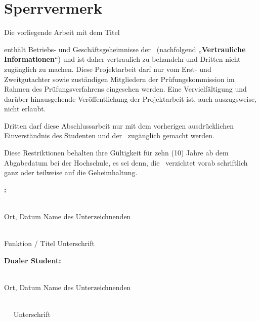 \newpage
{}
\section*{Sperrvermerk}

Die vorliegende Arbeit mit dem Titel

\begin{center}
	\normalsize\textit{\projecttitle}
\end{center}

enthält Betriebs- und Geschäftsgeheimnisse der \companyname\ (nachfolgend „\textbf{Vertrauliche Informationen}“) und ist daher vertraulich zu behandeln und Dritten nicht zugänglich zu machen.
Diese Projektarbeit darf nur vom Erst- und Zweitgutachter sowie zuständigen Mitgliedern der Prüfungskommission im Rahmen des Prüfungsverfahrens eingesehen werden. Eine Vervielfältigung und darüber hinausgehende Veröffentlichung der Projektarbeit ist, auch auszugsweise, nicht erlaubt.

Dritten darf diese Abschlussarbeit nur mit dem vorherigen ausdrücklichen Einverständnis des Studenten und der \companyname\ zugänglich gemacht werden.

Diese Restriktionen behalten ihre Gültigkeit für zehn (10) Jahre ab dem Abgabedatum bei der Hochschule, es sei denn, die \companyname\ verzichtet vorab schriftlich ganz oder teilweise auf die Geheimhaltung.

\vspace{0.2cm}

\textbf{\companyname:}

\vspace{0.9cm}

\noindent
\linedEntry{6.8cm}{\large\signaturelocation, \today} \hfill \linedEntry{6.8cm}{\large\signaturename} \\
\noindent
Ort, Datum
\hfill
Name des Unterzeichnenden

\vspace{0.9cm}

\noindent
\linedEntry{6.8cm}{\large\signaturefunction} \hfill \makebox[6.8cm]{\hrulefill} \\
\noindent
Funktion / Titel
\hfill
Unterschrift

\vspace{0.2cm}

\textbf{Dualer Student:}

\vspace{0.9cm}

\noindent
\linedEntry{6.8cm}{\large\signaturelocation, \today} \hfill \linedEntry{6.8cm}{{\large\studentname}} \\
\noindent
Ort, Datum
\hfill
Name des Unterzeichnenden

\vspace{0.9cm}

\noindent
\makebox[6.8cm]{} \hfill \makebox[6.8cm]{\hrulefill} \\
\noindent
 
\hfill
Unterschrift